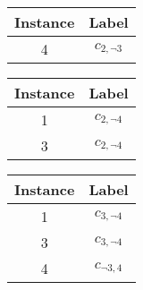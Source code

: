 \documentclass[Dissertation.tex]{subfiles}
\begin{document}
\begin{table}[]
\begin{subfigure}{1\linewidth}
	\vspace{1em}	
	\begin{subfigure}[t]{0.2\linewidth}
		\begin{tabular*}{1\linewidth}{@{}cc@{}}
			\toprule
			Instance & Label \\ \midrule
			4	&   $ c_{2,\neg3} $	    \\ \bottomrule
		\end{tabular*}
	\end{subfigure}
	\quad
	\begin{subfigure}[t]{0.2\linewidth}
		\begin{tabular*}{1\linewidth}{@{}cc@{}}
			\toprule
			Instance & Label \\ \midrule
			1	&	$ c_{2,\neg4} $        \\
			3	&	$ c_{2,\neg4} $        \\
			\bottomrule
		\end{tabular*}
	\end{subfigure}
	\quad
	\begin{subfigure}[t]{0.2\linewidth}
		\begin{tabular*}{1\linewidth}{@{}cc@{}}
			\toprule
			Instance & Label \\ \midrule
			1	&	$ c_{3,\neg4} $        \\
			3	&	$ c_{3,\neg4} $        \\
			4	&	$ c_{\neg3,4} $ \\
			\bottomrule
		\end{tabular*}
	\end{subfigure}	
\end{subfigure}
	
	
\end{table}
\end{document}
